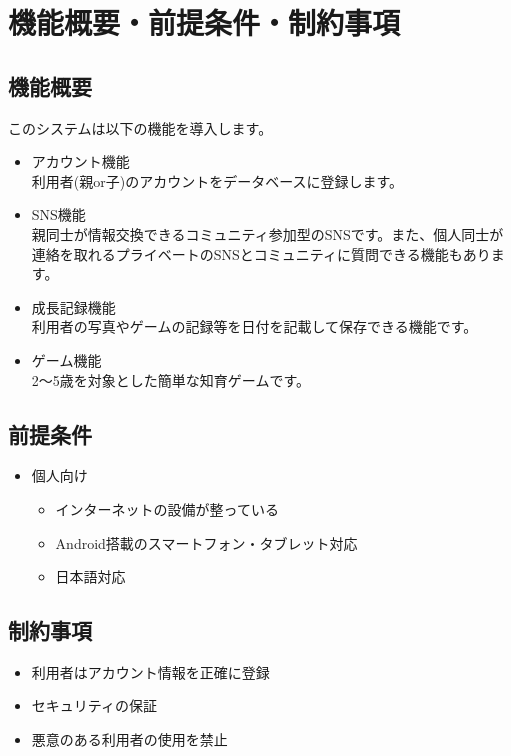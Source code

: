 \documentclass[a4j]{jarticle}
\begin{document}
\section{機能概要・前提条件・制約事項}

\subsection{機能概要}
このシステムは以下の機能を導入します。
\begin{itemize}
\item アカウント機能 ~\\
利用者(親or子)のアカウントをデータベースに登録します。
\item SNS機能 ~\\
親同士が情報交換できるコミュニティ参加型のSNSです。また、個人同士が連絡を取れるプライベートのSNSとコミュニティに質問できる機能もあります。
\item 成長記録機能 ~\\
利用者の写真やゲームの記録等を日付を記載して保存できる機能です。
\item ゲーム機能 ~\\
2～5歳を対象とした簡単な知育ゲームです。
\end{itemize}

\subsection{前提条件}
\begin{itemize}
  \item 個人向け
  \begin{itemize}
    \item インターネットの設備が整っている
　   \item Android搭載のスマートフォン・タブレット対応
　   \item 日本語対応
  \end{itemize}
\end{itemize}

\subsection{制約事項}

\begin{itemize}
\item 利用者はアカウント情報を正確に登録
\item セキュリティの保証
\item 悪意のある利用者の使用を禁止

\end{itemize}
\end{document}
